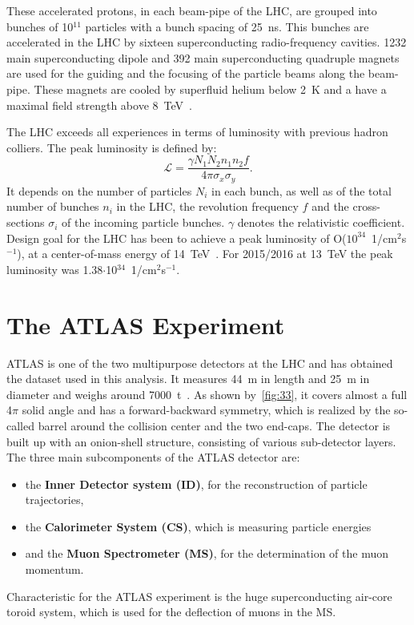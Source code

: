  These accelerated protons, in each beam-pipe of the LHC, are grouped into bunches of 10$^{11}$ particles with a bunch spacing of 25~ns. This bunches are accelerated in the LHC by sixteen superconducting radio-frequency cavities. 1232 main superconducting dipole and 392 main superconducting quadruple magnets are used for the guiding and the focusing of the particle beams along the beam-pipe. These magnets are cooled by superfluid helium below 2~K and a have a maximal field strength above 8~TeV~\cite{Evans:2008zzb}.   


 The LHC  exceeds all experiences in terms of luminosity with previous hadron colliers. The peak luminosity is defined by:
\begin{equation}
\mathscr{L} = \frac{\gamma N_1N_2n_1n_2f}{4\pi \sigma_x \sigma_y }.
\end{equation}
 It depends on the number of particles $N_i$ in each bunch, as well as of the total number of bunches $n_i$ in the LHC, the revolution frequency $f$ and the cross-sections $\sigma_i$ of the incoming particle bunches. $\gamma$ denotes the relativistic coefficient. Design goal for the LHC has been to achieve a peak luminosity of O($10^{34}$~1/cm$^2$s$^{-1}$), at a center-of-mass energy of 14~TeV~\cite{Bruning:2004ej}. For 2015/2016 at 13~TeV the peak luminosity was 1.38$\cdot$10$^{34}$~1/cm$^2$s$^{-1}$.  
 
 
\section{The ATLAS Experiment}\label{ATLAS}
 ATLAS  is one of the two multipurpose detectors at the LHC and has obtained the dataset used in this analysis. It measures 44~m in length and 25~m in diameter and weighs around 7000~t~\cite{Aad:2008zzm}. 
 As shown by~\cref{fig:33}, it covers almost a full 4$\pi$ solid angle and has a forward-backward symmetry, which is realized by the so-called barrel around the collision center and the two end-caps. The detector is built up with an onion-shell structure, consisting of various sub-detector layers. The three main subcomponents of the ATLAS detector are:
 \begin{itemize}
 	\item the \textbf{Inner Detector system (ID)}, for the reconstruction of particle trajectories, 
 	\item  the \textbf{Calorimeter System (CS)}, which is measuring particle energies
 	\item  and the \textbf{Muon Spectrometer (MS)}, for the determination of the muon momentum.
 \end{itemize} 
Characteristic for the ATLAS experiment is the huge superconducting air-core toroid system, which is used for the deflection of muons in the MS. 

